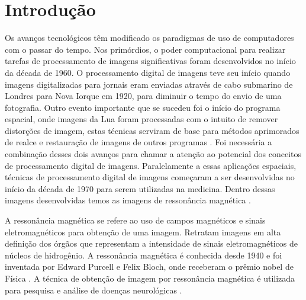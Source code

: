 \documentclass[openright]{UFRGS} %
\begin{document}
\listoffigures

\listoftables


\tableofcontents

\chapter{Introdução}

Os avanços tecnológicos têm modificado os paradigmas de uso de
computadores com o passar do tempo. Nos primórdios, o poder computacional
para realizar tarefas de processamento de imagens significativas foram desenvolvidos no início da década de 1960. O processamento digital de imagens teve seu início  quando
imagens digitalizadas para jornais eram enviadas através de cabo submarino de Londres para Nova Iorque em 1920, para diminuir o tempo do envio de uma fotografia. Outro evento importante  que se  sucedeu foi o início do
programa espacial, onde imagens da Lua foram processadas com o intuito de remover distorções de imagem, estas técnicas serviram de base para métodos aprimorados de realce e restauração de imagens de outros programas \cite{gonzalez2010processamento}. Foi necessária a combinação desses dois avanços para chamar a atenção ao potencial dos conceitos de processamento digital de imagens. Paralelamente a essas aplicações espaciais, técnicas
de processamento digital de imagens começaram a ser desenvolvidas no início da década de 1970 para serem utilizadas na  medicina. Dentro dessas imagens desenvolvidas temos as imagens de ressonância magnética \cite{gonzalez2010processamento}. 


A ressonância magnética se refere ao uso de campos magnéticos e sinais eletromagnéticos para obtenção de uma imagem. Retratam  imagens em alta definição dos órgãos que representam a intensidade de sinais eletromagnéticos de núcleos de hidrogênio. A ressonância magnética é conhecida desde 1940 e foi inventada por Edward Purcell e Felix Bloch, onde receberam o prêmio nobel de Física \cite{nacif2011manual}. A técnica de obtenção de imagem por ressonância magnética  é  utilizada para pesquisa e análise de doenças neurológicas \cite{AmaroJunior2001AspectosMagnetica}. 
\end{document}
